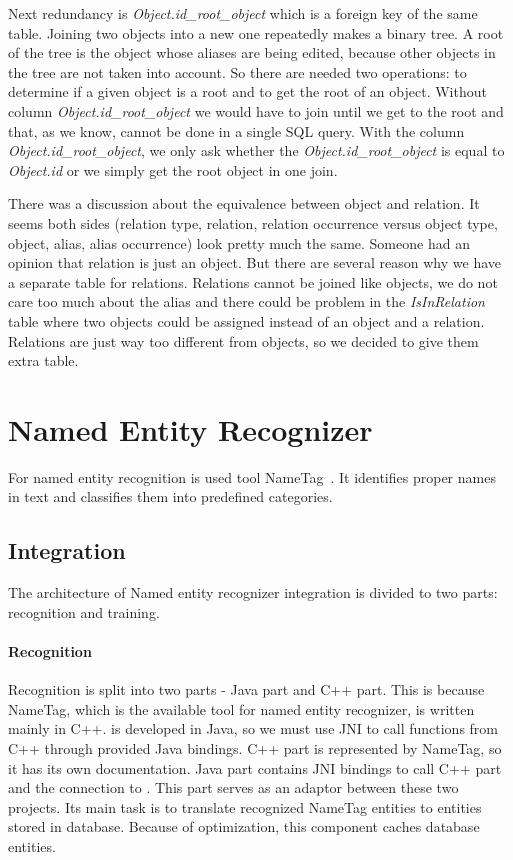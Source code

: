 Next redundancy is \emph{Object.id\_{}root\_{}object} which is a foreign key of
the same table. Joining two objects into a new one repeatedly
makes a binary tree. A root of the tree is the object whose aliases are being
edited, because other objects in the tree are not taken into account. So there are needed two operations: to determine if a given object is a root and to get the
root of an object. Without column \emph{Object.id\_{}root\_{}object} we would have to
join until we get to the root and that, as we know, cannot be done in a single
SQL query. With the column \emph{Object.id\_{}root\_{}object}, we only ask whether the \emph{Object.id\_{}root\_{}object} is equal to \emph{Object.id} or we simply get the root object in one join.

There was a discussion about the equivalence between object and relation. It
seems both sides (relation type, relation, relation occurrence versus object type,
object, alias, alias occurrence) look pretty much the same. Someone had an
opinion that relation is just an object. But there are several reason why we
have a separate table for relations. Relations cannot be joined like objects, we
do not care too much about the alias and there could be problem in the 
\emph{IsInRelation} table where two objects could be assigned instead of an
object and a relation. Relations are just way too different from objects, so we
decided to give them extra table.

\section{Named Entity Recognizer}
\label{sec:NamedEntityRecognizer}
For named entity recognition is used tool NameTag~\cite{strakova14}. It identifies proper names in text and classifies them into predefined categories.

\subsection{Integration}
The architecture of Named entity recognizer integration is divided to two parts: recognition
and training.

\paragraph{Recognition} 
Recognition is split into two parts - Java part and C++ part. This is because
NameTag, which is the available tool for named entity recognizer, is written
mainly in C++. \textan{} is developed in Java, so we must use JNI to call
functions from C++ through provided Java bindings. C++ part is represented by
NameTag, so it has its own documentation. Java part contains JNI bindings to
call C++ part and the connection to \textan{}. This part serves as an adaptor
between these two projects. Its main task is to translate recognized NameTag
entities to entities stored in \textan{} database. Because of optimization, this
component caches database entities.

